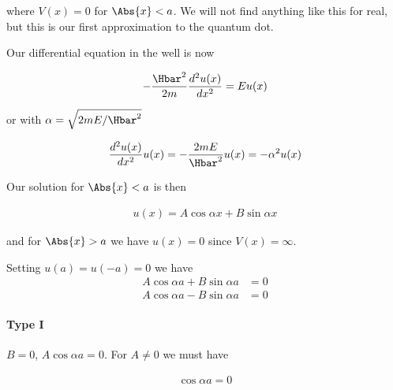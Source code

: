 where $V(x) = 0$ for $\Abs{x} < a$.  We will not find anything like this for real, but this is our first approximation to the quantum dot.

Our differential equation in the well is now

\begin{equation}\label{eqn:PHY356Lecture9:6}
\begin{aligned}
-\frac{\Hbar^2 }{2m} \frac{d^2 u(x)}{dx^2} = E u(x)
\end{aligned}
\end{equation}

or with $\alpha = \sqrt{2m E/\Hbar^2}$

\begin{equation}\label{eqn:PHY356Lecture9:7}
\begin{aligned}
\frac{d^2 u(x)}{dx^2} u(x) = -\frac{2 m E}{\Hbar^2} u(x) = - \alpha^2 u(x)
\end{aligned}
\end{equation}

Our solution for $\Abs{x} < a$ is then

\begin{equation}\label{eqn:PHY356Lecture9:8}
\begin{aligned}
u(x) = A \cos \alpha x + B \sin\alpha x
\end{aligned}
\end{equation}

and for $\Abs{x} > a$ we have $u(x) = 0$ since $V(x) = \infty$.

Setting $u(a) = u(-a) = 0$ we have
\begin{equation}\label{eqn:lecture9boundStates:100}
\begin{aligned}
A \cos \alpha a + B \sin\alpha a &= 0 \\
A \cos \alpha a - B \sin\alpha a &= 0
\end{aligned}
\end{equation}


\paragraph{Type I}
$B=0$, $A \cos\alpha a = 0$.  For $A \ne 0$ we must have

\begin{equation}\label{eqn:lecture9boundStates:120}
\begin{aligned}
\cos \alpha a = 0
\end{aligned}
\end{equation}


